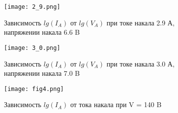 \documentclass[a4paper]{article}
\begin{document}
\begin{figure}[h]
\begin{center}
\begin{minipage}[h]{0.45\linewidth}
\texttt{[image: 2\_9.png]}
\caption{Зависимость $lg(I_A)$ от $lg(V_A)$ при токе накала 2.9 А, напряжении накала 6.6 B}
\end{minipage}
\hfill 
\begin{minipage}[h]{0.45\linewidth}
\texttt{[image: 3\_0.png]}
\caption{Зависимость $lg(I_A)$ от $lg(V_A)$ при токе накала 3.0 А, напряжении накала 7.0 B }
\end{minipage}
\end{center}
\end{figure}

\begin{figure}[h]
\begin{center}
\texttt{[image: fig4.png]}
\caption{Зависимость $lg(I_A)$ от тока накала при V = 140 B}
\end{center}
\end{figure}
\end{document}
